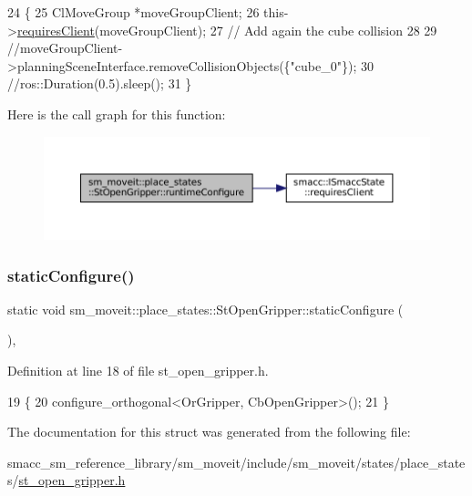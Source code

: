 \begin{DoxyCode}
24     \{
25         ClMoveGroup *moveGroupClient;
26         this->\hyperlink{classsmacc_1_1ISmaccState_a7f95c9f0a6ea2d6f18d1aec0519de4ac}{requiresClient}(moveGroupClient);
27         \textcolor{comment}{// Add again the cube collision}
28 
29         \textcolor{comment}{//moveGroupClient->planningSceneInterface.removeCollisionObjects(\{"cube\_0"\});}
30         \textcolor{comment}{//ros::Duration(0.5).sleep();}
31     \}
\end{DoxyCode}
Here is the call graph for this function\+:
\nopagebreak
\begin{figure}[H]
\begin{center}
\leavevmode
\includegraphics[width=350pt]{structsm__moveit_1_1place__states_1_1StOpenGripper_a49b45992f2ff9a5f1435b14eab1f2621_cgraph}
\end{center}
\end{figure}
\mbox{\label{structsm__moveit_1_1place__states_1_1StOpenGripper_a3a7ab2224ad0ca4c1e88d8432b0f37bf}} 
\subsubsection{\texorpdfstring{static\+Configure()}{staticConfigure()}}
{\footnotesize\ttfamily static void sm\+\_\+moveit\+::place\+\_\+states\+::\+St\+Open\+Gripper\+::static\+Configure (\begin{DoxyParamCaption}{ }\end{DoxyParamCaption})\hspace{0.3cm}{\ttfamily [inline]}, {\ttfamily [static]}}



Definition at line 18 of file st\+\_\+open\+\_\+gripper.\+h.


\begin{DoxyCode}
19     \{
20         configure\_orthogonal<OrGripper, CbOpenGripper>();
21     \}
\end{DoxyCode}


The documentation for this struct was generated from the following file\+:\begin{DoxyCompactItemize}
\item 
smacc\+\_\+sm\+\_\+reference\+\_\+library/sm\+\_\+moveit/include/sm\+\_\+moveit/states/place\+\_\+states/\hyperlink{st__open__gripper_8h}{st\+\_\+open\+\_\+gripper.\+h}\end{DoxyCompactItemize}
